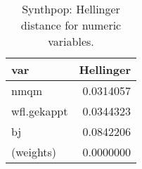 \begin{table}

\caption{\label{tab:tab:synthpop:hellinger}Synthpop: Hellinger distance for numeric variables.}
\centering
\begin{tabular}[t]{lr}
\toprule
var & Hellinger\\
\midrule
nmqm & 0.0314057\\
wfl.gekappt & 0.0344323\\
bj & 0.0842206\\
(weights) & 0.0000000\\
\bottomrule
\end{tabular}
\end{table}